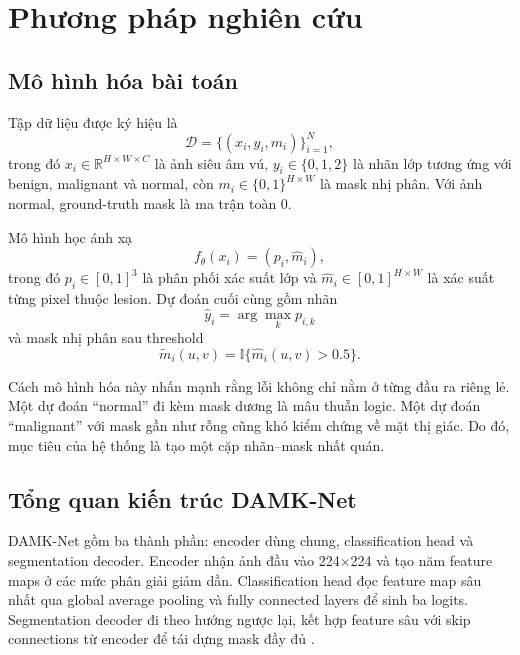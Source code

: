 \documentclass[12pt,a4paper,oneside]{report}
\newcommand{\modelname}{DAMK-Net}
\begin{document}
\chapter{Phương pháp nghiên cứu}

\section{Mô hình hóa bài toán}

Tập dữ liệu được ký hiệu là
\[
\mathcal{D}=\{(x_i,y_i,m_i)\}_{i=1}^{N},
\]
trong đó $x_i\in\mathbb{R}^{H\times W\times C}$ là ảnh siêu âm vú, $y_i\in\{0,1,2\}$ là nhãn lớp tương ứng với benign, malignant và normal, còn $m_i\in\{0,1\}^{H\times W}$ là mask nhị phân. Với ảnh normal, ground-truth mask là ma trận toàn 0.

Mô hình học ánh xạ
\[
f_\theta(x_i)=\left(p_i,\hat{m}_i\right),
\]
trong đó $p_i\in[0,1]^3$ là phân phối xác suất lớp và $\hat{m}_i\in[0,1]^{H\times W}$ là xác suất từng pixel thuộc lesion. Dự đoán cuối cùng gồm nhãn
\[
\hat{y}_i=\arg\max_k p_{i,k}
\]
và mask nhị phân sau threshold
\[
\tilde{m}_i(u,v)=\mathbb{I}\{\hat{m}_i(u,v)>0.5\}.
\]

Cách mô hình hóa này nhấn mạnh rằng lỗi không chỉ nằm ở từng đầu ra riêng lẻ. Một dự đoán ``normal'' đi kèm mask dương là mâu thuẫn logic. Một dự đoán ``malignant'' với mask gần như rỗng cũng khó kiểm chứng về mặt thị giác. Do đó, mục tiêu của hệ thống là tạo một cặp nhãn--mask nhất quán.

\section{Tổng quan kiến trúc \modelname{}}

\modelname{} gồm ba thành phần: encoder dùng chung, classification head và segmentation decoder. Encoder nhận ảnh đầu vào 224$\times$224 và tạo năm feature maps ở các mức phân giải giảm dần. Classification head đọc feature map sâu nhất qua global average pooling và fully connected layers để sinh ba logits. Segmentation decoder đi theo hướng ngược lại, kết hợp feature sâu với skip connections từ encoder để tái dựng mask đầy đủ \citep{mednet,mkunet,damknet}.
\end{document}
